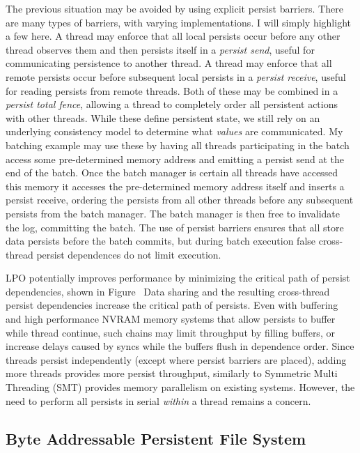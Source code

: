 The previous situation may be avoided by using explicit persist barriers.
There are many types of barriers, with varying implementations.
I will simply highlight a few here.
A thread may enforce that all local persists occur before any other thread observes them and then persists itself in a \emph{persist send}, useful for communicating persistence to another thread.
A thread may enforce that all remote persists occur before subsequent local persists in a \emph{persist receive}, useful for reading persists from remote threads.
Both of these may be combined in a \emph{persist total fence}, allowing a thread to completely order all persistent actions with other threads.
While these define persistent state, we still rely on an underlying consistency model to determine what \emph{values} are communicated.
My batching example may use these by having all threads participating in the batch access some pre-determined memory address and emitting a persist send at the end of the batch.
Once the batch manager is certain all threads have accessed this memory it accesses the pre-determined memory address itself and inserts a persist receive, ordering the persists from all other threads before any subsequent persists from the batch manager.
The batch manager is then free to invalidate the log, committing the batch.
The use of persist barriers ensures that all store data persists before the batch commits, but during batch execution false cross-thread persist dependences do not limit execution.


LPO potentially improves performance by minimizing the critical path of persist dependencies, shown in Figure~
Data sharing and the resulting cross-thread persist dependencies increase the critical path of persists.
Even with buffering and high performance NVRAM memory systems that allow persists to buffer while thread continue, such chains may limit throughput by filling buffers, or increase delays caused by syncs while the buffers flush in dependence order.
Since threads persist independently (except where persist barriers are placed), adding more threads provides more persist throughput, similarly to Symmetric Multi Threading (SMT) provides memory parallelism on existing systems.
However, the need to perform all persists in serial \emph{within} a thread remains a concern.

\subsection{Byte Addressable Persistent File System}
\label{sec:PMC:PersistenceModels:BPFS}

